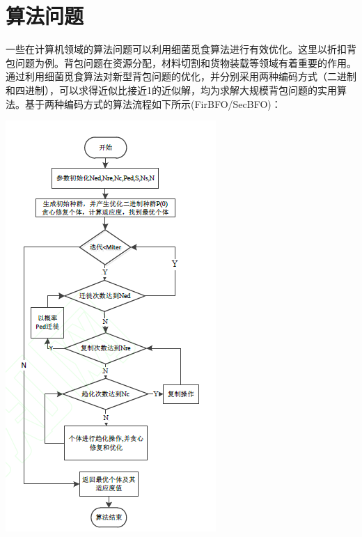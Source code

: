 \documentclass{article}
\begin{document}
\section{算法问题}
一些在计算机领域的算法问题可以利用细菌觅食算法进行有效优化。这里以折扣背包问题为例。背包问题在资源分配，材料切割和货物装载等领域有着重要的作用。通过利用细菌觅食算法对新型背包问题的优化，并分别采用两种编码方式（二进制和四进制），可以求得近似比接近1的近似解，均为求解大规模背包问题的实用算法\cite{ref5}。基于两种编码方式的算法流程如下所示(FirBFO/SecBFO)：
\begin{center}
\includegraphics[scale=1]{images/fflow.png}

\end{center}
\end{document}
